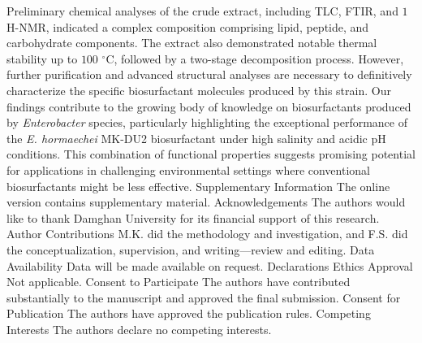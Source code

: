 \documentclass{svjour3}
\begin{document}
Preliminary chemical analyses of the crude extract, including TLC, FTIR, and $1$H-NMR, indicated a complex composition comprising lipid, peptide, and carbohydrate components. The extract also demonstrated notable thermal stability up to $100$ $^\circ$C, followed by a two-stage decomposition process. However, further purification and advanced structural analyses are necessary to definitively characterize the specific biosurfactant molecules produced by this strain. Our findings contribute to the growing body of knowledge on biosurfactants produced by \textit{Enterobacter} species, particularly highlighting the exceptional performance of the \textit{E. hormaechei} MK-DU2 biosurfactant under high salinity and acidic pH conditions. This combination of functional properties suggests promising potential for applications in challenging environmental settings where conventional biosurfactants might be less effective.
Supplementary Information The online version contains supplementary material.
Acknowledgements The authors would like to thank Damghan University for its financial support of this research.
Author Contributions M.K. did the methodology and investigation, and F.S. did the conceptualization, supervision, and writing—review and editing.
Data Availability Data will be made available on request.
Declarations 
Ethics Approval Not applicable.
Consent to Participate The authors have contributed substantially to the manuscript and approved the final submission.
Consent for Publication The authors have approved the publication rules.
Competing Interests The authors declare no competing interests.

\end{document}
